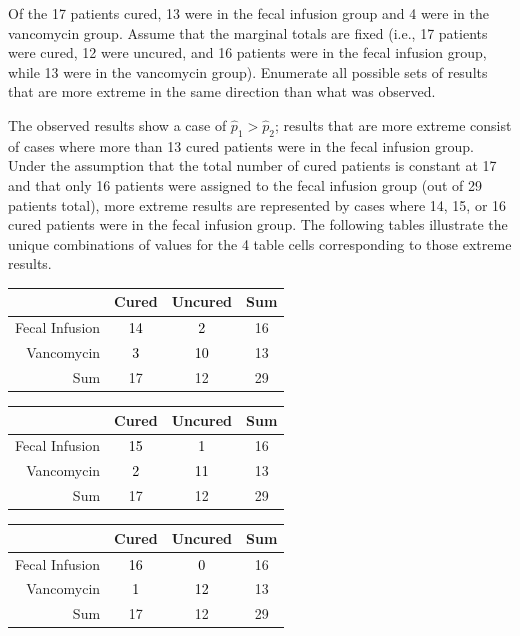 \begin{example}{Of the 17 patients cured, 13 were in the fecal infusion group and 4 were in the vancomycin group. Assume that the marginal totals are fixed (i.e., 17 patients were cured, 12 were uncured, and 16 patients were in the fecal infusion group, while 13 were in the vancomycin group). Enumerate all possible sets of results that are more extreme in the same direction than what was observed.}
	
The observed results show a case of $\hat{p}_1 > \hat{p}_2$; results that are more extreme consist of cases where more than 13 cured patients were in the fecal infusion group. Under the assumption that the total number of cured patients is constant at 17 and that only 16 patients were assigned to the fecal infusion group (out of 29 patients total), more extreme results are represented by cases where 14, 15, or 16 cured patients were in the fecal infusion group. The following tables illustrate the unique combinations of values for the 4 table cells corresponding to those extreme results.

\begin{table}[h]
	\centering
	\color{gray}
	\begin{tabular}{r|cc|c}
		\hline
		& Cured & Uncured & Sum \\ 
		\hline
		Fecal Infusion & \textcolor{black}{14} & \textcolor{black}{2} & 16 \\ 
		Vancomycin & \textcolor{black}{3} & \textcolor{black}{10} & 13 \\ 
		\hline
		Sum & 17 & 12 & 29 \\ 
		\hline
	\end{tabular}
\end{table}

\begin{table}[h]
	\centering
	\color{gray}
	\begin{tabular}{r|cc|c}
		\hline
		& Cured & Uncured & Sum \\ 
		\hline
		Fecal Infusion & \textcolor{black}{15} & \textcolor{black}{1} & 16 \\ 
		Vancomycin & \textcolor{black}{2} & \textcolor{black}{11} & 13 \\ 
		\hline
		Sum & 17 & 12 & 29 \\ 
		\hline
	\end{tabular}
\end{table}

\begin{table}[h]
	\centering
	\color{gray}
	\begin{tabular}{r|cc|c}
		\hline
		& Cured & Uncured & Sum \\ 
		\hline
		Fecal Infusion & \textcolor{black}{16} & \textcolor{black}{0} & 16 \\ 
		Vancomycin & \textcolor{black}{1} & \textcolor{black}{12} & 13 \\ 
		\hline
		Sum & 17 & 12 & 29 \\ 
		\hline
	\end{tabular}
\end{table}
	
\label{fecalStudyExtreme}	
\end{example}

